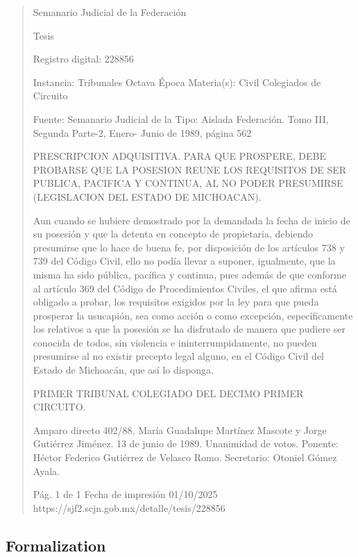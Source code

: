 \documentclass[11pt,a4paper]{article}
\begin{document}
\begin{quote}
                                                   Semanario Judicial de la Federación

                                                  Tesis

 Registro digital: 228856

 Instancia: Tribunales            Octava Época                          Materia(s): Civil
 Colegiados de Circuito

                                  Fuente: Semanario Judicial de la      Tipo: Aislada
                                  Federación.
                                  Tomo III, Segunda Parte-2, Enero-
                                  Junio de 1989, página 562


PRESCRIPCION ADQUISITIVA. PARA QUE PROSPERE, DEBE PROBARSE QUE LA POSESION
REUNE LOS REQUISITOS DE SER PUBLICA, PACIFICA Y CONTINUA, AL NO PODER
PRESUMIRSE (LEGISLACION DEL ESTADO DE MICHOACAN).


Aun cuando se hubiere demostrado por la demandada la fecha de inicio de su posesión y que la
detenta en concepto de propietaria, debiendo presumirse que lo hace de buena fe, por disposición
de los artículos 738 y 739 del Código Civil, ello no podía llevar a suponer, igualmente, que la misma
ha sido pública, pacífica y continua, pues además de que conforme al artículo 369 del Código de
Procedimientos Civiles, el que afirma está obligado a probar, los requisitos exigidos por la ley para
que pueda prosperar la usucapión, sea como acción o como excepción, específicamente los
relativos a que la posesión se ha disfrutado de manera que pudiere ser conocida de todos, sin
violencia e ininterrumpidamente, no pueden presumirse al no existir precepto legal alguno, en el
Código Civil del Estado de Michoacán, que así lo disponga.

PRIMER TRIBUNAL COLEGIADO DEL DECIMO PRIMER CIRCUITO.


Amparo directo 402/88. María Guadalupe Martínez Mascote y Jorge Gutiérrez Jiménez. 13 de junio
de 1989. Unanimidad de votos. Ponente: Héctor Federico Gutiérrez de Velasco Romo. Secretario:
Otoniel Gómez Ayala.




                                             Pág. 1 de 1             Fecha de impresión 01/10/2025
  https://sjf2.scjn.gob.mx/detalle/tesis/228856

\end{quote}

\subsection{Formalization}
\end{document}
